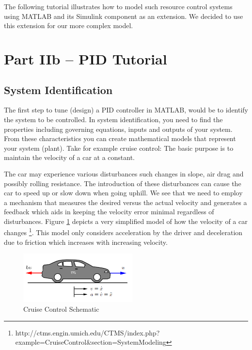 \documentclass[paper=letter, fontsize=11pt]{scrartcl}
\numberwithin{equation}{section}
\numberwithin{figure}{section}
\numberwithin{table}{section}
\begin{document}
\par
The following tutorial illustrates how to model such resource control systems
using \ac{MATLAB} and its Simulink component as an extension. We decided to
use this extension for our more complex model.

\clearpage
\section{Part IIb -- \acs{PID} Tutorial}
\subsection{System Identification}
\label{sec:system_identification}
\par
The first step to tune (design) a \ac{PID} controller in \ac{MATLAB}, would be
to identify the system to be controlled. In system identification, you need to
find the properties including governing equations, inputs and outputs of your
system. From these characteristics you can create mathematical models that
represent your system (plant). Take for example cruise control: The basic
purpose is to maintain the velocity of a car at a constant.
\newline
\par
The car may experience various disturbances such changes in slope, air drag and
possibly rolling resistance. The introduction of these disturbances can cause
the car to speed up or slow down when going uphill. We see that we need to
employ a mechanism that measures the desired versus the actual velocity and
generates a feedback which aids in keeping the velocity error minimal
regardless of disturbances. Figure \ref{fig:cruise_control_schematic} depicts
a very simplified model of how the velocity of a car changes
\footnote{http://ctms.engin.umich.edu/CTMS/index.php?example=CruiseControl\&section=SystemModeling}.
This model only considers acceleration by the driver and deceleration due to friction
which increases with increasing velocity.


\begin{figure}[h]
	\centering
	\includegraphics[height=100px]{graphics/cruise-control-schematic}
	\caption{Cruise Control Schematic}
	\label{fig:cruise_control_schematic}
\end{figure}
\end{document}
